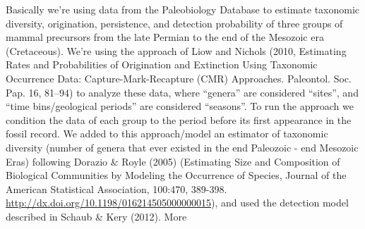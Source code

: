\documentclass[
]{article}
\begin{document}
Basically we're using data from the Paleobiology Database to estimate
taxonomic diversity, origination, persistence, and detection probability
of three groups of mammal precursors from the late Permian to the end of
the Mesozoic era (Cretaceous). We're using the approach of Liow and
Nichols (2010, Estimating Rates and Probabilities of Origination and
Extinction Using Taxonomic Occurrence Data: Capture-Mark-Recapture (CMR)
Approaches. Paleontol. Soc. Pap. 16, 81--94) to analyze these data,
where ``genera'' are considered ``sites'', and ``time bins/geological
periods'' are considered ``seasons''. To run the approach we condition
the data of each group to the period before its first appearance in the
fossil record. We added to this approach/model an estimator of taxonomic
diversity (number of genera that ever existed in the end Paleozoic - end
Mesozoic Eras) following Dorazio \& Royle (2005) (Estimating Size and
Composition of Biological Communities by Modeling the Occurrence of
Species, Journal of the American Statistical Association, 100:470,
389-398. \url{http://dx.doi.org/10.1198/016214505000000015}), and used
the detection model described in Schaub \& Kery (2012). More
\end{document}
